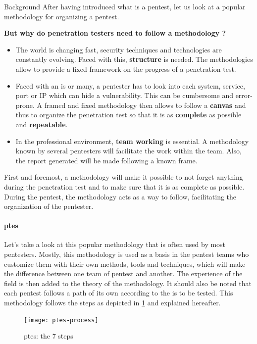 \begin{chaptercover}{Background}
After having introduced what is a pentest, let us look at a popular methodology for organizing a pentest.

\begin{question}
\textbf{But why do penetration testers need to follow a methodology ?}
\begin{itemize}
  \item The world is changing fast, security techniques and technologies are constantly evolving. Faced with this, \textbf{structure} is needed. The methodologies allow to provide a fixed framework on the progress of a penetration test.
  \item Faced with an \acrshort{is} or many, a pentester has to look into each system, service, port or IP which can hide a vulnerability. This can be cumbersome and error-prone. A framed and fixed methodology then allows to follow a \textbf{canvas} and thus to organize the penetration test so that it is as \textbf{complete} as possible and \textbf{repeatable}.
  \item In the professional environment, \textbf{team working} is essential. A methodology known by several pentesters will facilitate the work within the team. Also, the report generated will be made following a known frame.
\end{itemize}
\end{question}

First and foremost, a methodology will make it possible to not forget anything during the penetration test and to make sure that it is as complete as possible. During the pentest, the methodology acts as a way to follow, facilitating the organization of the pentester.

\paragraph{\acrfull{ptes} \cite{ptes}} Let's take a look at this popular methodology that is often used by most pentesters. Mostly, this methodology is used as a basis in the pentest teams who customize them with their own methods, tools and techniques, which will make the difference between one team of pentest and another. The experience of the field is then added to the theory of the methodology. It should also be noted that each pentest follows a path of its own according to the \acrshort{is} to be tested. This methodology follows the steps as depicted in \ref{fig:ptes-process} and explained hereafter.

\begin{figure}[H]
  \centering
  \texttt{[image: ptes-process]}
  \caption{\acrshort{ptes}: the 7 steps}
  \label{fig:ptes-process}
\end{figure}


\end{chaptercover}
